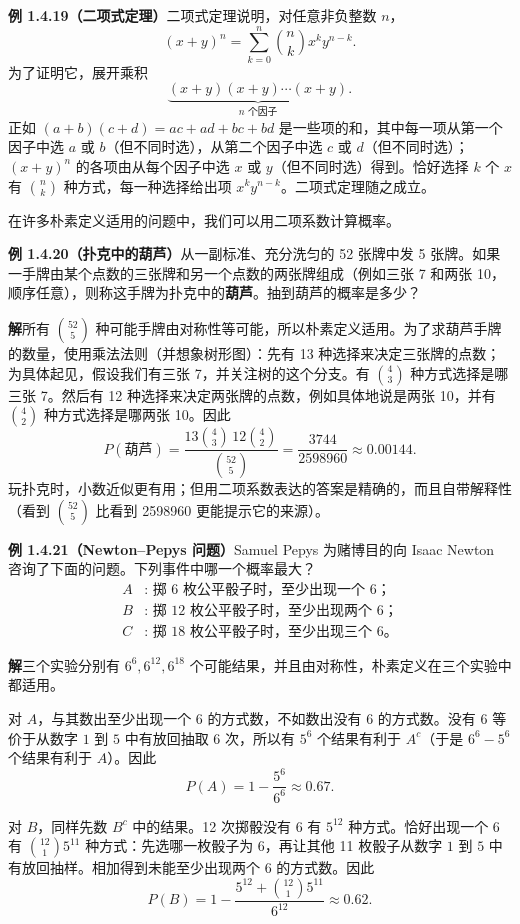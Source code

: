 \documentclass[UTF8,12pt,a4paper,fontset=fandol]{ctexart}
\begin{document}
\noindent\textbf{例 1.4.19（二项式定理）}\quad 二项式定理说明，对任意非负整数 $n$，
\[
  (x+y)^n=\sum_{k=0}^n \binom{n}{k}x^k y^{n-k}.
\]
为了证明它，展开乘积
\[
  \underbrace{(x+y)(x+y)\cdots(x+y)}_{n\text{ 个因子}}.
\]
正如 $(a+b)(c+d)=ac+ad+bc+bd$ 是一些项的和，其中每一项从第一个因子中选 $a$ 或 $b$（但不同时选），从第二个因子中选 $c$ 或 $d$（但不同时选）；$(x+y)^n$ 的各项由从每个因子中选 $x$ 或 $y$（但不同时选）得到。恰好选择 $k$ 个 $x$ 有 $\binom{n}{k}$ 种方式，每一种选择给出项 $x^k y^{n-k}$。二项式定理随之成立。

在许多朴素定义适用的问题中，我们可以用二项系数计算概率。

\noindent\textbf{例 1.4.20（扑克中的葫芦）}\quad 从一副标准、充分洗匀的 52 张牌中发 5 张牌。如果一手牌由某个点数的三张牌和另一个点数的两张牌组成（例如三张 7 和两张 10，顺序任意），则称这手牌为扑克中的\textbf{葫芦}。抽到葫芦的概率是多少？

\noindent\textbf{解}\quad 所有 $\binom{52}{5}$ 种可能手牌由对称性等可能，所以朴素定义适用。为了求葫芦手牌的数量，使用乘法法则（并想象树形图）：先有 13 种选择来决定三张牌的点数；为具体起见，假设我们有三张 7，并关注树的这个分支。有 $\binom43$ 种方式选择是哪三张 7。然后有 12 种选择来决定两张牌的点数，例如具体地说是两张 10，并有 $\binom42$ 种方式选择是哪两张 10。因此
\[
  P(\text{葫芦})
  =\frac{13\binom43\,12\binom42}{\binom{52}{5}}
  =\frac{3744}{2598960}\approx 0.00144.
\]
玩扑克时，小数近似更有用；但用二项系数表达的答案是精确的，而且自带解释性（看到 $\binom{52}{5}$ 比看到 2598960 更能提示它的来源）。

\noindent\textbf{例 1.4.21（Newton--Pepys 问题）}\quad Samuel Pepys 为赌博目的向 Isaac Newton 咨询了下面的问题。下列事件中哪一个概率最大？
\[
\begin{aligned}
A&:\text{ 掷 6 枚公平骰子时，至少出现一个 6；}\\
B&:\text{ 掷 12 枚公平骰子时，至少出现两个 6；}\\
C&:\text{ 掷 18 枚公平骰子时，至少出现三个 6。}
\end{aligned}
\]

\noindent\textbf{解}\quad 三个实验分别有 $6^6,6^{12},6^{18}$ 个可能结果，并且由对称性，朴素定义在三个实验中都适用。

对 $A$，与其数出至少出现一个 6 的方式数，不如数出没有 6 的方式数。没有 6 等价于从数字 $1$ 到 $5$ 中有放回抽取 6 次，所以有 $5^6$ 个结果有利于 $A^c$（于是 $6^6-5^6$ 个结果有利于 $A$）。因此
\[
  P(A)=1-\frac{5^6}{6^6}\approx 0.67.
\]

对 $B$，同样先数 $B^c$ 中的结果。12 次掷骰没有 6 有 $5^{12}$ 种方式。恰好出现一个 6 有 $\binom{12}{1}5^{11}$ 种方式：先选哪一枚骰子为 6，再让其他 11 枚骰子从数字 $1$ 到 $5$ 中有放回抽样。相加得到未能至少出现两个 6 的方式数。因此
\[
  P(B)=1-\frac{5^{12}+\binom{12}{1}5^{11}}{6^{12}}\approx 0.62.
\]
\end{document}
